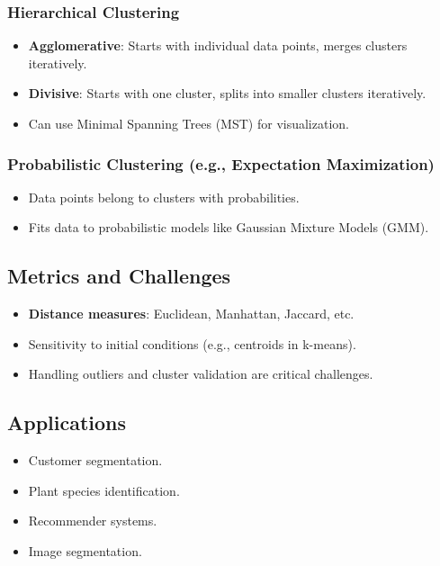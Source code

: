 \documentclass{article}
\begin{document}
\subsubsection*{Hierarchical Clustering}
\begin{itemize}
    \item \textbf{Agglomerative}: Starts with individual data points, merges clusters iteratively.
    \item \textbf{Divisive}: Starts with one cluster, splits into smaller clusters iteratively.
    \item Can use Minimal Spanning Trees (MST) for visualization.
\end{itemize}

\subsubsection*{Probabilistic Clustering (e.g., Expectation Maximization)}
\begin{itemize}
    \item Data points belong to clusters with probabilities.
    \item Fits data to probabilistic models like Gaussian Mixture Models (GMM).
\end{itemize}

\subsection*{Metrics and Challenges}
\begin{itemize}
    \item \textbf{Distance measures}: Euclidean, Manhattan, Jaccard, etc.
    \item Sensitivity to initial conditions (e.g., centroids in k-means).
    \item Handling outliers and cluster validation are critical challenges.
\end{itemize}

\subsection*{Applications}
\begin{itemize}
    \item Customer segmentation.
    \item Plant species identification.
    \item Recommender systems.
    \item Image segmentation.
\end{itemize}
\end{document}

